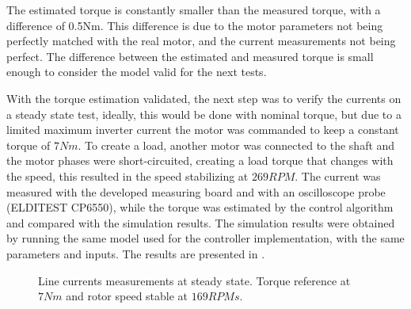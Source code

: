 The estimated torque is constantly smaller than the measured torque, with a difference of 0.5Nm. This difference is due to the motor parameters not being perfectly matched with the real motor, and the current measurements not being perfect. The difference between the estimated and measured torque is small enough to consider the model valid for the next tests.

With the torque estimation validated, the next step was to verify the currents on a steady state test, ideally, this would be done with nominal torque, but due to a limited maximum inverter current the motor was commanded to keep a constant torque of $7Nm$. To create a load, another motor was connected to the shaft and the motor phases were short-circuited, creating a load torque that changes with the speed, this resulted in the speed stabilizing at $269RPM$. The current was measured with the developed measuring board and with an oscilloscope probe (ELDITEST CP6550), while the torque was estimated by the control algorithm and compared with the simulation results. The simulation results were obtained by running the same model used for the controller implementation, with the same parameters and inputs. The results are presented in .
\begin{figure}[!htb]
	\begin{subfigmatrix}{2}
	\end{subfigmatrix}
	\caption{Line currents measurements at steady state. Torque reference at $7Nm$ and rotor speed stable at $169RPMs$.}
	\label{fig:steady_state_curr} %
\end{figure}

